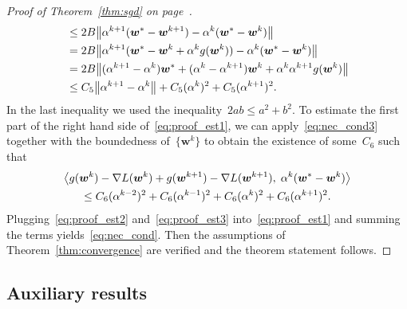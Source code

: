 \begin{proof}[Proof of Theorem~\ref{thm:sgd} on page~\pageref{thm:sgd}]
\begin{equation}
\begin{aligned}
    & \le 2B\norm{\alpha^{k+1}(\bm{w}^*-\bm{w}^{k+1})-\alpha^k(\bm{w}^*-\bm{w}^{k})} \\
    & = 2B\norm{\alpha^{k+1}(\bm{w}^*-\bm{w}^k+\alpha^kg(\bm{w}^k))-\alpha^k(\bm{w}^*-\bm{w}^{k})} \\
    & = 2B\norm{(\alpha^{k+1}-\alpha^k)\bm{w}^* + (\alpha^k-\alpha^{k+1})\bm{w}^k +\alpha^k\alpha^{k+1} g(\bm{w}^k)} \\
    & \le C_5 \norm{\alpha^{k+1}-\alpha^k} + C_5(\alpha^k)^2 + C_5(\alpha^{k+1})^2.
    \end{aligned}
  \end{equation}
  In the last inequality we used the inequality~$2ab\le a^2+b^2$. To estimate the first part of the right hand side of~\eqref{eq:proof_est1}, we can apply~\eqref{eq:nec_cond3} together with the boundedness of~$\{\bm{w}^k\}$ to obtain the existence of some~$C_6$ such that
  \begin{multline}\label{eq:proof_est3}
    \inner{ g(\bm{w}^{k}) -\nabla L(\bm{w}^{k}) + g(\bm{w}^{k+1})-\nabla L(\bm{w}^{k+1})}{\alpha^k(\bm{w}^* - \bm{w}^{k})} \\
      \le C_6(\alpha^{k-2})^2 + C_6(\alpha^{k-1})^2 + C_6(\alpha^{k})^2 + C_6(\alpha^{k+1})^2.
  \end{multline}
  Plugging~\eqref{eq:proof_est2} and~\eqref{eq:proof_est3} into~\eqref{eq:proof_est1} and summing the terms yields~\eqref{eq:nec_cond}. Then the assumptions of Theorem~\ref{thm:convergence} are verified and the theorem statement follows.
\end{proof}

\subsection{Auxiliary results}\label{app:sgd3}

